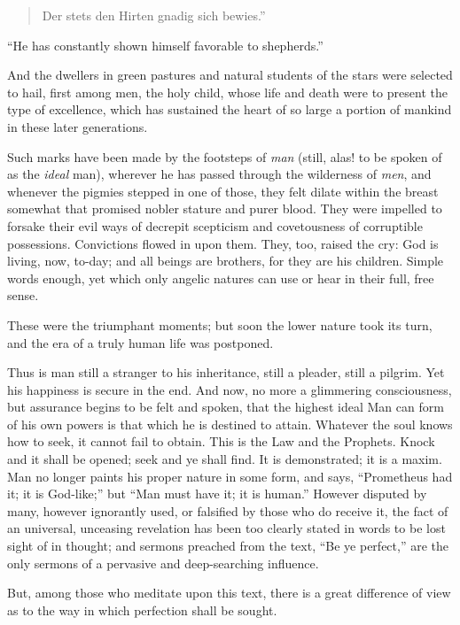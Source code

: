 \begin{verse}
Der stets den Hirten gnadig sich bewies.''
\end{verse}

\noindent ``He has constantly shown himself favorable to
shepherds.''

And the dwellers in green pastures and natural students of the stars
were selected to hail, first among men, the holy child, whose life and
death were to present the type of excellence, which has sustained the
heart of so large a portion of mankind in these later generations.

Such marks have been made by the footsteps of \textit{man} (still,
alas! to be spoken of as the \textit{ideal} man), wherever he has
passed through the wilderness of \textit{men}, and whenever the
pigmies stepped in one of those, they felt dilate within the breast
somewhat that promised nobler stature and purer blood. They were
impelled to forsake their evil ways of decrepit scepticism and
covetousness of corruptible possessions. Convictions flowed in upon
them. They, too, raised the cry: God is living, now, to-day; and all
beings are brothers, for they are his children. Simple words enough,
yet which only angelic natures can use or hear in their full, free
sense.

These were the triumphant moments; but soon the lower nature took its
turn, and the era of a truly human life was postponed.

Thus is man still a stranger to his inheritance, still a
pleader, still a pilgrim. Yet his happiness is secure in the end. And
now, no more a glimmering consciousness, but assurance begins to be
felt and spoken, that the highest ideal Man can form of his own powers
is that which he is destined to attain. Whatever the soul knows how to
seek, it cannot fail to obtain. This is the Law and the Prophets.
Knock and it shall be opened; seek and ye shall find. It is
demonstrated; it is a maxim. Man no longer paints his proper nature in
some form, and says, ``Prometheus had it; it is God-like;'' but ``Man
must have it; it is human.'' However disputed by many, however
ignorantly used, or falsified by those who do receive it, the fact of
an universal, unceasing revelation has been too clearly stated in
words to be lost sight of in thought; and sermons preached from the
text, ``Be ye perfect,'' are the only sermons of a pervasive and
deep-searching influence.

But, among those who meditate upon this text, there is a great
difference of view as to the way in which perfection shall be sought.

